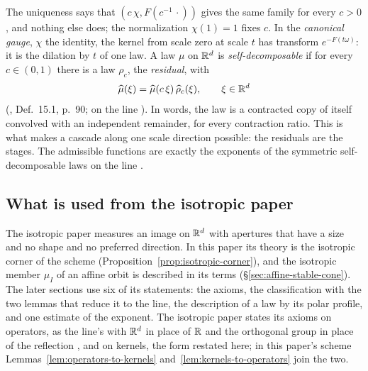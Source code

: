 The uniqueness says that $(c\,\chi, F(c^{-1}\,\cdot))$ gives the same family for every $c > 0$, and
nothing else does; the normalization $\chi(1) = 1$ fixes $c$. In the \emph{canonical gauge}, $\chi$
the identity, the kernel from scale zero at scale $t$ has
transform $e^{-F(t\omega)}$: it is the dilation by $t$ of one law. A law
$\mu$ on $\mathbb{R}^d$ is \emph{self-decomposable} if for every $c \in (0,1)$ there is a law $\rho_c$, the
\emph{residual}, with
\begin{equation}\label{eq:self-decomposable}
  \widehat\mu(\xi) = \widehat\mu(c\,\xi)\,\widehat\rho_c(\xi), \qquad \xi \in \mathbb{R}^d
\end{equation}
(, Def.~15.1, p.~90; on the line ). In words, the law is a
contracted copy of itself convolved with an independent remainder, for every contraction ratio.
This is what makes a cascade along one scale direction possible: the residuals are the stages.
The admissible functions are exactly the exponents of the symmetric self-decomposable laws on the
line .

\subsection{What is used from the isotropic paper}\label{sec:iso-recap}

The isotropic paper measures an image on $\mathbb{R}^d$ with apertures that have a size and no shape and
no preferred direction. In this paper its theory is the isotropic corner of the scheme
(Proposition~\ref{prop:isotropic-corner}), and the isotropic member $\mu_I$ of an affine orbit is
described in its terms (\S\ref{sec:affine-stable-cone}). The later sections use six of its
statements: the axioms, the classification with the two lemmas that reduce it to the line, the
description of a law by its polar profile, and one estimate of the exponent. The isotropic paper
states its axioms on operators, as the line's with $\mathbb{R}^d$ in place of $\mathbb{R}$ and the orthogonal
group in place of the reflection , and on kernels, the form restated here; in
this paper's scheme Lemmas~\ref{lem:operators-to-kernels} and~\ref{lem:kernels-to-operators} join
the two.

